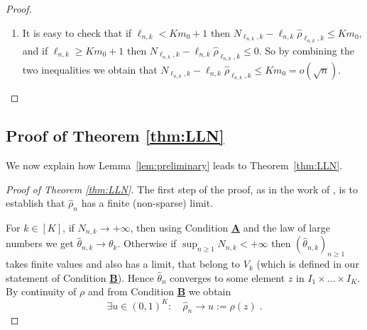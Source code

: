 \documentclass[11pt]{article}
\theoremstyle{plain}
\theoremstyle{definition}
\begin{document}
\begin{appendix}
\begin{proof}
\begin{enumerate}[label=(\roman*)]
		\item It is easy to check that if $\ell_{n,k} < K m_0+1$ then \(N_{\ell_{n,k},k} - \ell_{n,k} \hat{\rho}_{\ell_{n,k},k} \leq K m_0\),
		and if \(\ell_{n,k} \geq Km_0 + 1\) then \(N_{\ell_{n,k},k} - \ell_{n,k} \hat{\rho}_{\ell_{n,k},k} \leq 0\).
		So by combining the two inequalities we obtain that \(N_{\ell_{n,k},k} - \ell_{n,k} \hat{\rho}_{\ell_{n,k},k} \leq K m_0 = o(\sqrt{n})\)\;.
	\end{enumerate}
\end{proof}

\subsection{Proof of Theorem \ref{thm:LLN}}\label{proof:thm1}

We now explain how Lemma~\ref{lem:preliminary} leads to Theorem~\ref{thm:LLN}.

\begin{proof}[Proof of Theorem \ref{thm:LLN}]	
The first step of the proof, as in the work of \cite{hu2004asymptotic}, is to establish that $\hat{\rho}_{n}$ has a finite (non-sparse) limit.
	
	For \(k \in [K]\), if \(N_{n,k} \to +\infty\), then using  Condition \hyperlink{CA}{\textbf{A}} and the law of large numbers %
	we get \(\hat\theta_{n,k} \to \theta_k\). Otherwise if \(\sup_{n \geq 1}N_{n,k} < +\infty\) then \(\left(\hat\theta_{n,k}\right)_{n \geq 1}\) takes finite values and also has a limit, that belong to $V_k$ (which is defined in our statement of Condition  \hyperlink{CB}{\textbf{B}}). Hence $\hat\theta_{n}$ converges to some element $z$ in $I_1\times \dots \times I_K$.  By continuity of $\rho$ and from Condition \hyperlink{CB}{\textbf{B}} we obtain
	\begin{equation}\label{eq:conv-rho}
		\exists u \in (0,1)^K: \quad \hat{\rho}_n \to u:= \rho(z)\;.
	\end{equation}
	

\end{proof}
\end{appendix}
\end{document}
